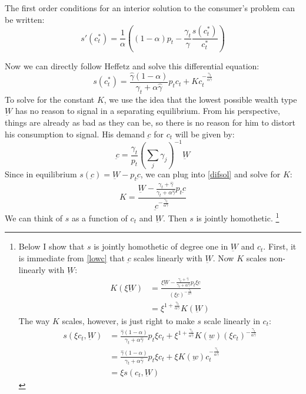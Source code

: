 \documentclass[12pt]{article}
\begin{document}
The first order conditions for an interior solution to the consumer's problem can be written:
\begin{equation}
	\label{foc}
s'(c_t^*) = \frac{1}{\alpha}\left( \left( 1-\alpha\right) p_t - \frac{\gamma_t}{\hat{\gamma}}\frac{s(c_t^*)}{c_t^*}\right)
\end{equation}

Now we can directly follow Heffetz and solve this differential equation:
\begin{equation}
	\label{difsol}
	s(c_t^*) = \frac{\hat{\gamma}\left(1-\alpha\right)}{\gamma_t +\alpha \hat{\gamma}} p_t c_t + K c_t^{-\frac{\gamma_t}{\alpha \hat{\gamma}}}
\end{equation}
To solve for the constant $K$, we use the idea that the lowest possible wealth type $\underbar{W}$ has no reason to signal in a separating equilibrium.
From his perspective, things are already as bad as they can be, so there is no reason for him to distort his consumption to signal.  His demand $\underbar{c}$ for $c_t$ will be given by:
\begin{equation}
	\label{lowc}
	\underbar{c} = \frac{\gamma_t}{p_t}\left(\sum_{j} \gamma_j\right)^{-1}\underbar{W} 
\end{equation}
Since in equilibrium $s(\underbar{c}) = \underbar{W} - p_t \underbar{c}$, we can plug into \eqref{difsol} and solve for $K$:
\[
K = \frac{\underbar{W}- \frac{\gamma_t + \hat{\gamma}}{\gamma_t + \alpha \hat{\gamma}}p_t \underbar{c}}{\underbar{c}^{-\frac{\gamma_t}{\alpha \hat{\gamma}}}}
\]
We can think of $s$ as a function of $c_t$ and $\underbar{W}$. 
Then $s$ is jointly homothetic.  
\footnote{
Below I show that $s$ is jointly homothetic of degree one in $\underbar{W}$ and $c_t$.  First, it is immediate from \eqref{lowc} that $\underbar{c}$ scales linearly with $\underbar{W}$.
Now $K$ scales non-linearly with $\underbar{W}$:
\begin{align*}
	K(\xi\underbar{W}) &= \frac{\xi\underbar{W}- \frac{\gamma_t + \hat{\gamma}}{\gamma_t + \alpha \hat{\gamma}}p_t \xi \underbar{c}}{(\xi\underbar{c})^{-\frac{\gamma_t}{\alpha \hat{\gamma}}}} \\
	&= \xi^{1 + \frac{\gamma_t}{\alpha \hat{\gamma}}}K(\underbar{W})
\end{align*}
The way $K$ scales, however, is just right to make $s$ scale linearly in $c_t$:
\begin{align*}
	s(\xi c_t,\underbar{W}) &= \frac{\hat{\gamma}\left(1-\alpha\right)}{\gamma_t +\alpha \hat{\gamma}} p_t \xi c_t + \xi^{1+\frac{\gamma_t}{\alpha \hat{\gamma}}} K(\underbar{w}) (\xi c_t)^{-\frac{\gamma_t}{\alpha \hat{\gamma}}} \\
	&= \frac{\hat{\gamma}\left(1-\alpha\right)}{\gamma_t +\alpha \hat{\gamma}} p_t \xi c_t + \xi K(\underbar{w}) c_t^{-\frac{\gamma_t}{\alpha \hat{\gamma}}} \\
	&= \xi s(c_t,\underbar{W})
\end{align*}
}
\end{document}
